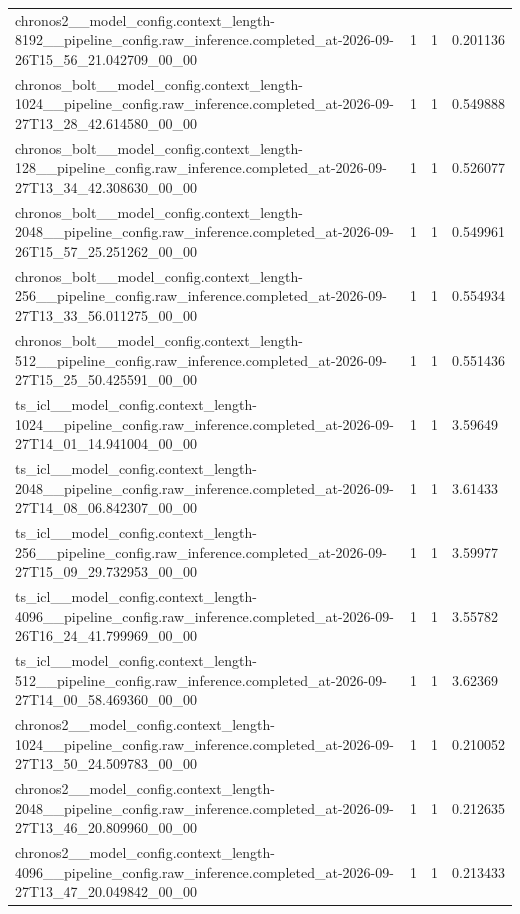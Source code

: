 \begin{tabular}{llll}
chronos2\_\_model\_config.context\_length-8192\_\_pipeline\_config.raw\_inference.completed\_at-2026-09-26T15\_56\_21.042709\_00\_00 & 1 & 1 & 0.201136 \\
chronos\_bolt\_\_model\_config.context\_length-1024\_\_pipeline\_config.raw\_inference.completed\_at-2026-09-27T13\_28\_42.614580\_00\_00 & 1 & 1 & 0.549888 \\
chronos\_bolt\_\_model\_config.context\_length-128\_\_pipeline\_config.raw\_inference.completed\_at-2026-09-27T13\_34\_42.308630\_00\_00 & 1 & 1 & 0.526077 \\
chronos\_bolt\_\_model\_config.context\_length-2048\_\_pipeline\_config.raw\_inference.completed\_at-2026-09-26T15\_57\_25.251262\_00\_00 & 1 & 1 & 0.549961 \\
chronos\_bolt\_\_model\_config.context\_length-256\_\_pipeline\_config.raw\_inference.completed\_at-2026-09-27T13\_33\_56.011275\_00\_00 & 1 & 1 & 0.554934 \\
chronos\_bolt\_\_model\_config.context\_length-512\_\_pipeline\_config.raw\_inference.completed\_at-2026-09-27T15\_25\_50.425591\_00\_00 & 1 & 1 & 0.551436 \\
ts\_icl\_\_model\_config.context\_length-1024\_\_pipeline\_config.raw\_inference.completed\_at-2026-09-27T14\_01\_14.941004\_00\_00 & 1 & 1 & 3.59649 \\
ts\_icl\_\_model\_config.context\_length-2048\_\_pipeline\_config.raw\_inference.completed\_at-2026-09-27T14\_08\_06.842307\_00\_00 & 1 & 1 & 3.61433 \\
ts\_icl\_\_model\_config.context\_length-256\_\_pipeline\_config.raw\_inference.completed\_at-2026-09-27T15\_09\_29.732953\_00\_00 & 1 & 1 & 3.59977 \\
ts\_icl\_\_model\_config.context\_length-4096\_\_pipeline\_config.raw\_inference.completed\_at-2026-09-26T16\_24\_41.799969\_00\_00 & 1 & 1 & 3.55782 \\
ts\_icl\_\_model\_config.context\_length-512\_\_pipeline\_config.raw\_inference.completed\_at-2026-09-27T14\_00\_58.469360\_00\_00 & 1 & 1 & 3.62369 \\
chronos2\_\_model\_config.context\_length-1024\_\_pipeline\_config.raw\_inference.completed\_at-2026-09-27T13\_50\_24.509783\_00\_00 & 1 & 1 & 0.210052 \\
chronos2\_\_model\_config.context\_length-2048\_\_pipeline\_config.raw\_inference.completed\_at-2026-09-27T13\_46\_20.809960\_00\_00 & 1 & 1 & 0.212635 \\
chronos2\_\_model\_config.context\_length-4096\_\_pipeline\_config.raw\_inference.completed\_at-2026-09-27T13\_47\_20.049842\_00\_00 & 1 & 1 & 0.213433 \\

\end{tabular}
